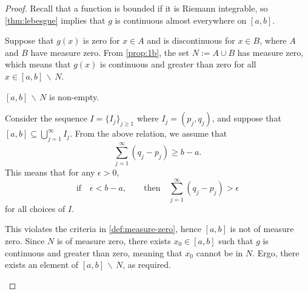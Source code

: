 \begin{enumerate}
\begin{enumerate}
\begin{enumerate}
                        \smallskip

                        \begin{proof}
                            Recall that a function is bounded if it is Riemann integrable, so \cref{thm:lebesgue} implies that $g$ is continuous almost everywhere on $[a, b]$.

                            Suppose that $g(x)$ is zero for $x \in A$ and is discontinuous for $x \in B$, where $A$ and $B$ have measure zero.
                            From \cref{prop:1b}, the set $N := A \cup B$ has measure zero, which means that $g(x)$ is continuous and greater than zero for all $x \in [a, b] \, \backslash \, N$.

                            \smallskip

                            \begin{claim} \label{claim:1ci-1}
                                $[a, b] \, \backslash \, N$ is non-empty.
                            \end{claim}

                            \begin{subproof}
                                Consider the sequence $I = \{I_j\}_{j \ge 1}$ where $I_j = (p_j, q_j)$, and suppose that $[a, b] \subseteq \bigcup_{j = 1}^\infty I_j$.
                                From the above relation, we assume that
                                \[ \sum_{j = 1}^\infty (q_j - p_j) \ge b - a. \]
                                This means that for any $\epsilon > 0$,
                                \[
                                    \text{if} \quad \epsilon < b - a, \qquad
                                    \text{then} \quad \sum_{j = 1}^\infty (q_j - p_j) > \epsilon
                                \]
                                for all choices of $I$.

                                This violates the criteria in \cref{def:measure-zero}, hence $[a, b]$ is not of measure zero.
                                Since $N$ is of measure zero, there exists $x_0 \in [a, b]$ such that $g$ is continuous and greater than zero, meaning that $x_0$ cannot be in $N$.
                                Ergo, there exists an element of $[a, b] \, \backslash \, N$, as required.
                            \end{subproof}

                            \smallskip


\end{proof}
\end{enumerate}
\end{enumerate}
\end{enumerate}
